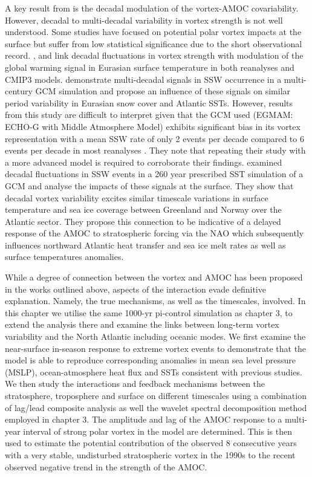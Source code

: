 A key result from \cite{reichlerStratospheric2012b} is the decadal modulation of the vortex-AMOC covariability. However, decadal to multi-decadal variability in vortex strength is not well understood. Some studies have focused on potential polar vortex impacts at the surface but suffer from low statistical significance due to the short observational record. \cite{garfinkelStratospheric2017b}, \cite{garfinkelEffect2015b} and \cite{cohenDecadal2009b} link decadal fluctuations in vortex strength with modulation of the global warming signal in Eurasian surface temperature in both reanalyses and CMIP3 models. \cite{schimankeMultidecadal2011b} demonstrate multi-decadal signals in SSW occurrence in a multi-century GCM simulation and propose an influence of these signals on similar period variability in Eurasian snow cover and Atlantic SSTs. However, results from this study are difficult to interpret given that the GCM used (EGMAM: ECHO‐G with Middle Atmosphere Model) exhibits significant bias in its vortex representation with a mean SSW rate of only 2 events per decade compared to 6 events per decade in most reanalyses \citep{ayarzaguenaRepresentation2019a}. They note that repeating their study with a more advanced model is required to corroborate their findings. \cite{manziniStratospheretroposphere2012b} examined decadal fluctuations in SSW events in a 260 year prescribed SST simulation of a GCM and analyse the impacts of these signals at the surface. They show that decadal vortex variability excites similar timescale variations in surface temperature and sea ice coverage between Greenland and Norway over the Atlantic sector. They propose this connection to be indicative of a delayed response of the AMOC to stratospheric forcing via the NAO which  subsequently influences northward Atlantic heat transfer and sea ice melt rates as well as surface temperatures anomalies. 

While a degree of connection between the vortex and AMOC has been proposed in the works outlined above, aspects of the interaction evade definitive explanation. Namely, the true mechanisms, as well as the timescales, involved. In this chapter we utilise the same 1000-yr pi-control simulation as chapter 3, to extend the analysis there and examine the links between long-term vortex variability and the North Atlantic including oceanic modes. We first examine the near-surface in-season response to extreme vortex events to demonstrate that the model is able to reproduce corresponding anomalies in mean sea level pressure (MSLP), ocean-atmosphere heat flux and SSTs consistent with previous studies. We then study the interactions and feedback mechanisms between the stratosphere, troposphere and surface on different timescales using a combination of lag/lead composite analysis as well the wavelet spectral decomposition method employed in chapter 3. The amplitude and lag of the AMOC response to a multi-year interval of strong polar vortex in the model are determined. This is then used to estimate the potential contribution of the observed 8 consecutive years with a very stable, undisturbed stratospheric vortex in the 1990s \citep{pawsonCold1999b} to the recent observed negative trend in the strength of the AMOC.


